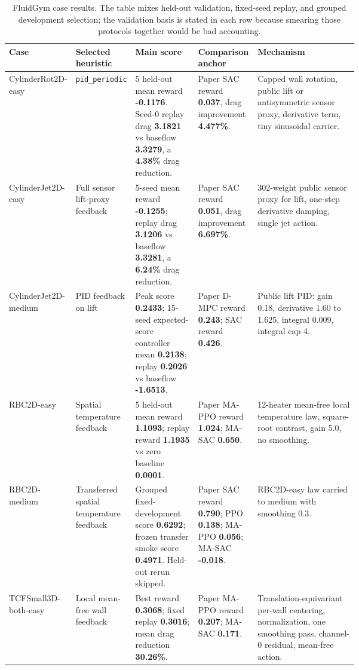 \documentclass[10pt]{article}
\newcommand{\score}[1]{\textbf{#1}}
\newcommand{\code}[1]{\texttt{\small #1}}
\begin{document}
\begin{table}[H]
\centering
\scriptsize
\begin{tabularx}{\linewidth}{L{0.17\linewidth}L{0.16\linewidth}L{0.18\linewidth}L{0.17\linewidth}Y}
\toprule
Case & Selected heuristic & Main score & Comparison anchor & Mechanism \\
\midrule
CylinderRot2D-easy &
\code{pid\_periodic} &
5 held-out mean reward \score{-0.1176}. Seed-0 replay drag \score{3.1821} vs baseflow \score{3.3279}, a \score{4.38\%} drag reduction. &
Paper SAC reward \score{0.037}, drag improvement \score{4.477\%}. &
Capped wall rotation, public lift or antisymmetric sensor proxy, derivative term, tiny sinusoidal carrier. \\
CylinderJet2D-easy &
Full sensor lift-proxy feedback &
5-seed mean reward \score{-0.1255}; replay drag \score{3.1206} vs baseflow \score{3.3281}, a \score{6.24\%} drag reduction. &
Paper SAC reward \score{0.051}, drag improvement \score{6.697\%}. &
302-weight public sensor proxy for lift, one-step derivative damping, single jet action. \\
CylinderJet2D-medium &
PID feedback on lift &
Peak score \score{0.2433}; 15-seed expected-score controller mean \score{0.2138}; replay \score{0.2026} vs baseflow \score{-1.6513}. &
Paper D-MPC reward \score{0.243}; SAC reward \score{0.426}. &
Public lift PID: gain 0.18, derivative 1.60 to 1.625, integral 0.009, integral cap 4. \\
RBC2D-easy &
Spatial temperature feedback &
5 held-out mean reward \score{1.1093}; replay reward \score{1.1935} vs zero baseline \score{0.0001}. &
Paper MA-PPO reward \score{1.024}; MA-SAC \score{0.650}. &
12-heater mean-free local temperature law, square-root contrast, gain 5.0, no smoothing. \\
RBC2D-medium &
Transferred spatial temperature feedback &
Grouped fixed-development score \score{0.6292}; frozen transfer smoke score \score{0.4971}. Held-out rerun skipped. &
Paper SAC reward \score{0.790}; PPO \score{0.138}; MA-PPO \score{0.056}; MA-SAC \score{-0.018}. &
RBC2D-easy law carried to medium with smoothing 0.3. \\
TCFSmall3D-both-easy &
Local mean-free wall feedback &
Best reward \score{0.3068}; fixed replay \score{0.3016}; mean drag reduction \score{30.26\%}. &
Paper MA-PPO reward \score{0.207}; MA-SAC \score{0.171}. &
Translation-equivariant per-wall centering, normalization, one smoothing pass, channel-0 residual, mean-free action. \\
\bottomrule
\end{tabularx}
\caption{FluidGym case results. The table mixes held-out validation, fixed-seed replay, and grouped development selection; the validation basis is stated in each row because smearing those protocols together would be bad accounting.}
\end{table}
\end{document}
